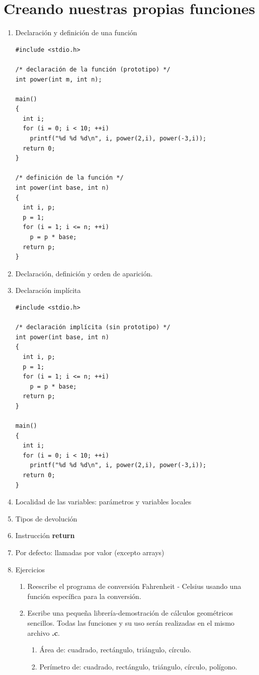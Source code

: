 \documentclass[a4paper,oneside]{article}
\begin{document}
\section{Creando nuestras propias funciones}
  \begin{enumerate}
  \item Declaración y definición de una función

    \begin{verbatim}
#include <stdio.h>

/* declaración de la función (prototipo) */
int power(int m, int n);

main()
{
  int i;
  for (i = 0; i < 10; ++i)
    printf("%d %d %d\n", i, power(2,i), power(-3,i));
  return 0;
}

/* definición de la función */
int power(int base, int n)
{
  int i, p;
  p = 1;
  for (i = 1; i <= n; ++i)
    p = p * base;
  return p;
}
    \end{verbatim}
  \item Declaración, definición y orden de aparición.
  \item Declaración implícita

    \begin{verbatim}
#include <stdio.h>

/* declaración implícita (sin prototipo) */
int power(int base, int n)
{
  int i, p;
  p = 1;
  for (i = 1; i <= n; ++i)
    p = p * base;
  return p;
}

main()
{
  int i;
  for (i = 0; i < 10; ++i)
    printf("%d %d %d\n", i, power(2,i), power(-3,i));
  return 0;
}
    \end{verbatim}
  \item Localidad de las variables: parámetros y variables locales
  \item Tipos de devolución
  \item Instrucción \textbf{return}
  \item Por defecto: llamadas por valor (excepto arrays)
  \item{Ejercicios}
    \begin{enumerate}
    \item Reescribe el programa de conversión Fahrenheit - Celsius usando una función específica para la conversión.
    \item Escribe una pequeña librería-demostración de cálculos geométricos sencillos. Todas las funciones y su uso serán realizadas en el mismo archivo \textbf{.c}.
      \begin{enumerate}
      \item Área de: cuadrado, rectángulo, triángulo, círculo.
      \item Perímetro de: cuadrado, rectángulo, triángulo, círculo, polígono.
      \end{enumerate}
    \end{enumerate}
  \end{enumerate}
\end{document}
